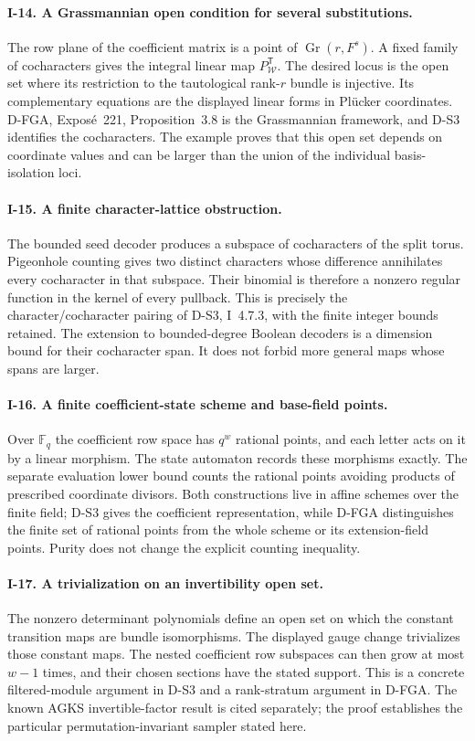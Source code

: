 \paragraph{I-14. A Grassmannian open condition for several substitutions.}
The row plane of the coefficient matrix is a point of $\operatorname{Gr}(r,F^s)$. A fixed family of cocharacters gives the integral linear map $P_{\mathcal W}^{\mathsf T}$. The desired locus is the open set where its restriction to the tautological rank-$r$ bundle is injective. Its complementary equations are the displayed linear forms in Pl\"ucker coordinates. D-FGA, Expos\'e~221, Proposition~3.8 is the Grassmannian framework, and D-S3 identifies the cocharacters. The example proves that this open set depends on coordinate values and can be larger than the union of the individual basis-isolation loci.

\paragraph{I-15. A finite character-lattice obstruction.}
The bounded seed decoder produces a subspace of cocharacters of the split torus. Pigeonhole counting gives two distinct characters whose difference annihilates every cocharacter in that subspace. Their binomial is therefore a nonzero regular function in the kernel of every pullback. This is precisely the character/cocharacter pairing of D-S3, I~4.7.3, with the finite integer bounds retained. The extension to bounded-degree Boolean decoders is a dimension bound for their cocharacter span. It does not forbid more general maps whose spans are larger.

\paragraph{I-16. A finite coefficient-state scheme and base-field points.}
Over $\mathbb F_q$ the coefficient row space has $q^w$ rational points, and each letter acts on it by a linear morphism. The state automaton records these morphisms exactly. The separate evaluation lower bound counts the rational points avoiding products of prescribed coordinate divisors. Both constructions live in affine schemes over the finite field; D-S3 gives the coefficient representation, while D-FGA distinguishes the finite set of rational points from the whole scheme or its extension-field points. Purity does not change the explicit counting inequality.

\paragraph{I-17. A trivialization on an invertibility open set.}
The nonzero determinant polynomials define an open set on which the constant transition maps are bundle isomorphisms. The displayed gauge change trivializes those constant maps. The nested coefficient row subspaces can then grow at most $w-1$ times, and their chosen sections have the stated support. This is a concrete filtered-module argument in D-S3 and a rank-stratum argument in D-FGA. The known AGKS invertible-factor result is cited separately; the proof establishes the particular permutation-invariant sampler stated here.

